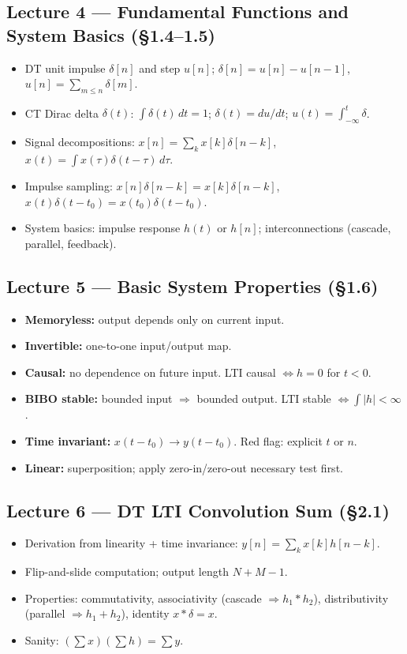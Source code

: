 \documentclass[11pt]{article}
\begin{document}
\subsection{Lecture 4 --- Fundamental Functions and System Basics (\S 1.4--1.5)}
\begin{itemize}[leftmargin=*]
    \item DT unit impulse $\delta[n]$ and step $u[n]$; $\delta[n] = u[n]-u[n-1]$, $u[n] = \sum_{m\leq n}\delta[m]$.
    \item CT Dirac delta $\delta(t)$: $\int\delta(t)\,dt = 1$; $\delta(t) = du/dt$; $u(t) = \int_{-\infty}^{t}\delta$.
    \item Signal decompositions: $x[n] = \sum_k x[k]\delta[n-k]$, $x(t) = \int x(\tau)\delta(t-\tau)\,d\tau$.
    \item Impulse sampling: $x[n]\delta[n-k] = x[k]\delta[n-k]$, $x(t)\delta(t-t_0) = x(t_0)\delta(t-t_0)$.
    \item System basics: impulse response $h(t)$ or $h[n]$; interconnections (cascade, parallel, feedback).
\end{itemize}

\subsection{Lecture 5 --- Basic System Properties (\S 1.6)}
\begin{itemize}[leftmargin=*]
    \item \textbf{Memoryless:} output depends only on current input.
    \item \textbf{Invertible:} one-to-one input/output map.
    \item \textbf{Causal:} no dependence on future input. LTI causal $\iff h=0$ for $t<0$.
    \item \textbf{BIBO stable:} bounded input $\Rightarrow$ bounded output. LTI stable $\iff \int|h|<\infty$.
    \item \textbf{Time invariant:} $x(t-t_0)\to y(t-t_0)$. Red flag: explicit $t$ or $n$.
    \item \textbf{Linear:} superposition; apply zero-in/zero-out necessary test first.
\end{itemize}

\subsection{Lecture 6 --- DT LTI Convolution Sum (\S 2.1)}
\begin{itemize}[leftmargin=*]
    \item Derivation from linearity + time invariance: $y[n] = \sum_k x[k]h[n-k]$.
    \item Flip-and-slide computation; output length $N+M-1$.
    \item Properties: commutativity, associativity (cascade $\Rightarrow h_1*h_2$), distributivity (parallel $\Rightarrow h_1+h_2$), identity $x*\delta = x$.
    \item Sanity: $(\sum x)(\sum h) = \sum y$.
\end{itemize}
\end{document}
